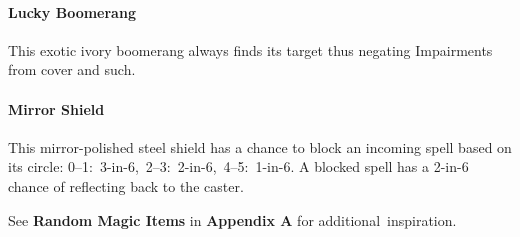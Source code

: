 \documentclass[itdr]{subfiles}
\begin{document}
\paragraph{Lucky Boomerang}
This exotic ivory boomerang always finds its target thus negating Impairments from cover and such.

\paragraph{Mirror Shield}
This mirror-polished steel shield has a chance to block an incoming spell based on its circle: \mbox{0--1: 3-in-6, 2--3: 2-in-6, 4--5: 1-in-6}. A blocked spell has a 2-in-6 chance of reflecting back to the caster.

\vfill

\begin{dbox}
	See \textbf{Random Magic Items} in \textbf{Appendix A} for \mbox{additional inspiration}.
\end{dbox}

\vfill
\end{document}
